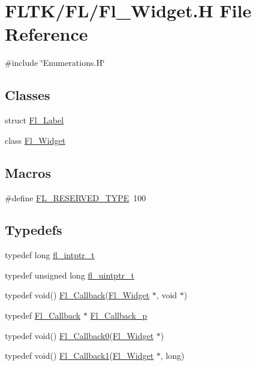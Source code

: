 \hypertarget{_fl___widget_8_h}{}\section{F\+L\+T\+K/\+F\+L/\+Fl\+\_\+\+Widget.H File Reference}
\label{_fl___widget_8_h}
{\ttfamily \#include \char`\"{}Enumerations.\+H\char`\"{}}\newline
\subsection*{Classes}
\begin{DoxyCompactItemize}
\item 
struct \hyperlink{struct_fl___label}{Fl\+\_\+\+Label}
\item 
class \hyperlink{class_fl___widget}{Fl\+\_\+\+Widget}
\end{DoxyCompactItemize}
\subsection*{Macros}
\begin{DoxyCompactItemize}
\item 
\#define \hyperlink{_fl___widget_8_h_ad300ac1cbbe7744c87fc376ce0eb9cc7}{F\+L\+\_\+\+R\+E\+S\+E\+R\+V\+E\+D\+\_\+\+T\+Y\+PE}~100
\end{DoxyCompactItemize}
\subsection*{Typedefs}
\begin{DoxyCompactItemize}
\item 
typedef long \hyperlink{_fl___widget_8_h_a6c7d27e81f16857f18da5e4ce097de75}{fl\+\_\+intptr\+\_\+t}
\item 
typedef unsigned long \hyperlink{_fl___widget_8_h_a0c2a2b4e6f4413cf8fbdda84b75bd420}{fl\+\_\+uintptr\+\_\+t}
\item 
typedef void() \hyperlink{_fl___widget_8_h_a640bea0193560eec20903c45c93c7472}{Fl\+\_\+\+Callback}(\hyperlink{class_fl___widget}{Fl\+\_\+\+Widget} $\ast$, void $\ast$)
\item 
typedef \hyperlink{_fl___widget_8_h_a640bea0193560eec20903c45c93c7472}{Fl\+\_\+\+Callback} $\ast$ \hyperlink{_fl___widget_8_h_ad515601d7e8cbd1c65ece6364e8c23d0}{Fl\+\_\+\+Callback\+\_\+p}
\item 
typedef void() \hyperlink{_fl___widget_8_h_a6ce47be89b1f24ea198fd2c93951969e}{Fl\+\_\+\+Callback0}(\hyperlink{class_fl___widget}{Fl\+\_\+\+Widget} $\ast$)
\item 
typedef void() \hyperlink{_fl___widget_8_h_a25bc4848432a4fbd426456f2952712eb}{Fl\+\_\+\+Callback1}(\hyperlink{class_fl___widget}{Fl\+\_\+\+Widget} $\ast$, long)
\end{DoxyCompactItemize}


